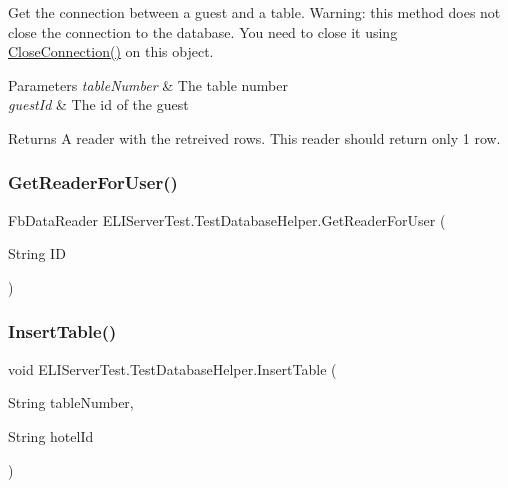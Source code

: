 Get the connection between a guest and a table. Warning\+: this method does not close the connection to the database. You need to close it using \hyperlink{class_e_l_i_server_test_1_1_test_database_helper_ae1ec2aaa4d83ed9f63a02844ec32600e}{Close\+Connection()} on this object. 


\begin{DoxyParams}{Parameters}
{\em table\+Number} & The table number\\
\hline
{\em guest\+Id} & The id of the guest\\
\hline
\end{DoxyParams}
\begin{DoxyReturn}{Returns}
A reader with the retreived rows. This reader should return only 1 row.
\end{DoxyReturn}
\mbox{\label{class_e_l_i_server_test_1_1_test_database_helper_a82181a75035efca85bacd09a8cf8aec9}} 
\subsubsection{\texorpdfstring{Get\+Reader\+For\+User()}{GetReaderForUser()}}
{\footnotesize\ttfamily Fb\+Data\+Reader E\+L\+I\+Server\+Test.\+Test\+Database\+Helper.\+Get\+Reader\+For\+User (\begin{DoxyParamCaption}\item[{String}]{ID }\end{DoxyParamCaption})\hspace{0.3cm}{\ttfamily [inline]}}

\mbox{\label{class_e_l_i_server_test_1_1_test_database_helper_acce24ced899bd0c952ac41a1a2657491}} 
\subsubsection{\texorpdfstring{Insert\+Table()}{InsertTable()}}
{\footnotesize\ttfamily void E\+L\+I\+Server\+Test.\+Test\+Database\+Helper.\+Insert\+Table (\begin{DoxyParamCaption}\item[{String}]{table\+Number,  }\item[{String}]{hotel\+Id }\end{DoxyParamCaption})\hspace{0.3cm}{\ttfamily [inline]}}

